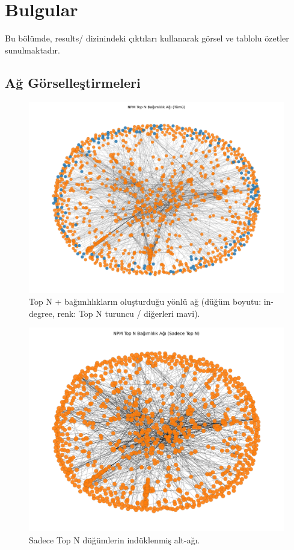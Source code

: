 \documentclass[11pt,a4paper]{article}
\begin{document}
\section{Bulgular}
Bu bölümde, results/ dizinindeki çıktıları kullanarak görsel ve tablolu özetler sunulmaktadır.

\subsection{Ağ Görselleştirmeleri}
\begin{figure}[h]
  \centering
  \includegraphics[width=0.95\linewidth]{network_full_topN.png}

  \caption{Top N + bağımlılıkların oluşturduğu yönlü ağ (düğüm boyutu: in-degree, renk: Top N turuncu / diğerleri mavi).}
\end{figure}

\begin{figure}[h]
  \centering
  \includegraphics[width=0.85\linewidth]{network_topN_only.png}

  \caption{Sadece Top N düğümlerin indüklenmiş alt-ağı.}
\end{figure}
\end{document}
